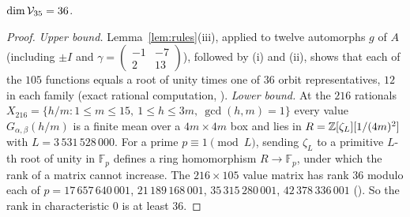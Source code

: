 \begin{proposition}\label{prop:dimV}
$\dim\mathcal V_{35}=36$.
\end{proposition}
\begin{proof}
\emph{Upper bound.} Lemma~\ref{lem:rules}(iii), applied to twelve automorphs $g$ of $A$ (including $\pm I$ and
$\gamma=\left(\begin{smallmatrix}-1&-7\\2&13\end{smallmatrix}\right)$), followed by (i) and (ii), shows that each of the $105$ functions equals a
root of unity times one of $36$ orbit representatives, $12$ in each family (exact rational computation, ).
\emph{Lower bound.} At the $216$ rationals $X_{216}=\{h/m:1\le m\le15,\ 1\le h\le3m,\ \gcd(h,m)=1\}$ every value $G_{\alpha,\beta}(h/m)$ is a finite
mean over a $4m\times4m$ box and lies in $R=\mathbb{Z}[\zeta_L][1/(4m)^2]$ with $L=3\,531\,528\,000$. For a prime $p\equiv1\pmod L$, sending $\zeta_L$ to a
primitive $L$-th root of unity in $\mathbb F_p$ defines a ring homomorphism $R\to\mathbb F_p$, under which the rank of a matrix cannot increase.
The $216\times105$ value matrix has rank $36$ modulo each of $p=17\,657\,640\,001$, $21\,189\,168\,001$, $35\,315\,280\,001$, $42\,378\,336\,001$
(). So the rank in characteristic $0$ is at least $36$.
\end{proof}


